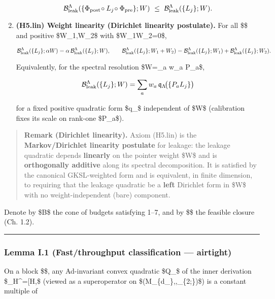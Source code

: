 \documentclass[
]{article}
\numberwithin{equation}{section}
\begin{document}
\begin{enumerate}
  \[
  \mathcal B_{\rm leak}^\Lambda(\{\Phi_{\rm post}\!\circ L_j\!\circ \Phi_{\rm pre}\};W)\ \le\ \mathcal B_{\rm leak}^\Lambda(\{L_j\};W).
  \]
\item
  \textbf{(H5.lin) Weight linearity (Dirichlet linearity postulate).}
  For all \$\alpha{}\$ and positive \$W\_1,W\_2\$ with
  \$W\_1W\_2=0\$,

  \[
  \mathcal B_{\rm leak}^\Lambda(\{L_j\};\alpha W)=\alpha\,\mathcal B_{\rm leak}^\Lambda(\{L_j\};W),\qquad
  \mathcal B_{\rm leak}^\Lambda(\{L_j\};W_1+W_2)=\mathcal B_{\rm leak}^\Lambda(\{L_j\};W_1)+\mathcal B_{\rm leak}^\Lambda(\{L_j\};W_2).
  \]

  Equivalently, for the spectral resolution \$W=\sum\_a w\_a P\_a\$,

  \[
  \mathcal B_{\rm leak}^\Lambda(\{L_j\};W)=\sum_a w_a\,\mathfrak q_\Lambda\!\big(\{P_a L_j\}\big)
  \]

  for a fixed positive quadratic form \$\mathfrak q\_\Lambda\$
  independent of \$W\$ (calibration fixes its scale on rank-one
  \$P\_a\$).
\end{enumerate}

\begin{quote}
\textbf{Remark (Dirichlet linearity).} Axiom (H5.lin) is the
\textbf{Markov/Dirichlet linearity postulate} for leakage: the leakage
quadratic depends \textbf{linearly} on the pointer weight \$W\$ and is
\textbf{orthogonally additive} along its spectral decomposition. It is
satisfied by the canonical GKSL-weighted form and is equivalent, in
finite dimension, to requiring that the leakage quadratic be a
\textbf{left} Dirichlet form in \$W\$ with no weight-independent (bare)
component.
\end{quote}

Denote by \$\mathfrak B\$ the cone of budgets satisfying 1--7, and by
\$\$ the feasible closure (Ch. 1.2).

\begin{center}\rule{0.5\linewidth}{0.5pt}\end{center}

\hypertarget{lemma-i.1-fastthroughput-classification-airtight}{%
\subsubsection{Lemma I.1 (Fast/throughput classification ---
airtight)}\label{lemma-i.1-fastthroughput-classification-airtight}}

On a block \$\Lambda\$, any Ad-invariant convex quadratic \$Q\_\Lambda\$
of the inner derivation \$\delta\_H\^{}\Lambda={[}H,\cdot{]}\$ (viewed
as a superoperator on
\$(M\_\{d\_\Lambda\},\langle\cdot,\cdot\rangle\_\{2;\Lambda\})\$) is a
constant multiple of
\end{document}
